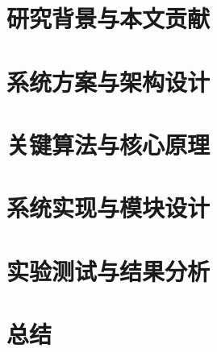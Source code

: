 \documentclass[12pt,a4paper,openany]{ctexrep}
\begin{document}
\chapter{研究背景与本文贡献}


\chapter{系统方案与架构设计}


\chapter{关键算法与核心原理}


\chapter{系统实现与模块设计}


\chapter{实验测试与结果分析}


\chapter{总结}


\newpage
{}

\end{document}
